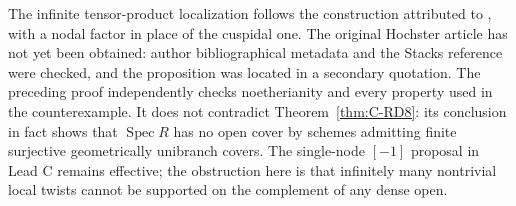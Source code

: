 \begin{remark}
The infinite tensor-product localization follows the construction
attributed to \cite[Proposition~1 and Example~1]{Hochster1973Loci},
with a nodal factor in place of the cuspidal one. The original
Hochster article has not yet been obtained: author bibliographical
metadata and the Stacks reference were checked, and the proposition
was located in a secondary quotation. The preceding proof independently
checks noetherianity and every property used in the counterexample.
It does not contradict Theorem~\ref{thm:C-RD8}: its conclusion in fact
shows that $\operatorname{Spec}R$ has no open cover by schemes admitting
finite surjective geometrically unibranch covers. The single-node
$[-1]$ proposal in Lead C remains effective; the obstruction here is
that infinitely many nontrivial local twists cannot be supported on
the complement of any dense open.
\end{remark}

